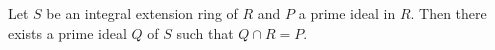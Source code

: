 Let $S$ be an integral extension ring of $R$ and $P$ a prime ideal in $R$. Then there exists a prime ideal $Q$ of $S$ such that $Q \cap R = P$.
